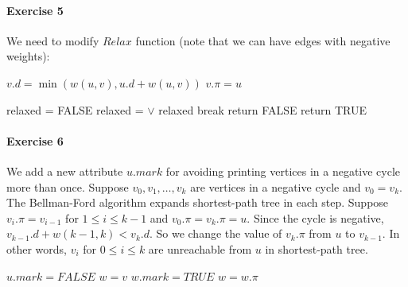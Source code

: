 \documentclass{book}
\begin{document}
	\paragraph{Exercise 5}
	We need to modify $Relax$ function (note that we can have edges with negative weights):
	\begin{algorithm*}[h!]
		\begin{algorithmic}[1]
					\State $v.d = \min(w(u, v), u.d + w(u, v))$
					\State $v.\pi = u$
				\EndIf
			\EndFunction
		\end{algorithmic}

		\begin{algorithmic}[1]
				\State {}
					\State relaxed = FALSE
						\State relaxed =  $\lor$ relaxed
					\EndFor
						\State break
					\EndIf
				\EndFor
						\State return FALSE
					\EndIf
				\EndFor
				\State return TRUE
			\EndFunction
		\end{algorithmic}		
	\end{algorithm*}	
	\FloatBarrier
	\paragraph{Exercise 6}
	We add a new attribute $u.mark$ for avoiding printing vertices in a negative cycle more than once. Suppose $v_0, v_1, \dots, v_k$ are vertices in a negative cycle and $v_0 = v_k$. The Bellman-Ford algorithm expands shortest-path tree in each step. Suppose $v_i.\pi = v_{i - 1}$ for $1 \le i \le k - 1$ and $v_0.\pi = v_k.\pi = u$. Since the cycle is negative, $v_{k - 1}.d + w(k - 1, k) < v_k.d$. So we change the value of $v_k.\pi$ from $u$ to $v_{k - 1}$. In other words, $v_i$ for $0 \le i \le k$ are unreachable from $u$ in shortest-path tree.
	\begin{algorithm*}[h!]
		\begin{algorithmic}[1]
				\State {}
						\State {}
					\EndFor
				\EndFor
					\State $u.mark = FALSE$
				\EndFor
						\State $w = v$
							\State $w.mark = TRUE$
							\State {}
							\State $w = w.\pi$
						\EndWhile
					\EndIf
				\EndFor
			\EndFunction
		\end{algorithmic}
	\end{algorithm*}
	\FloatBarrier
\end{document}
